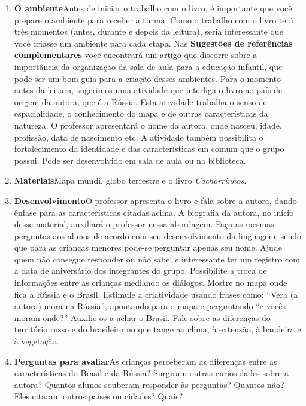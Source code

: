 \documentclass[11pt]{extarticle}
\begin{document}
\begin{enumerate}
\item \textbf{O ambiente}\quad Antes de iniciar o trabalho com o livro, é importante que você 
prepare o ambiente para receber a turma. Como o trabalho com o livro terá 
três momentos (antes, durante e depois da leitura), seria interessante que você 
criasse um ambiente para cada etapa. Nas \textbf{Sugestões de referências complementares} 
você encontrará um artigo que discorre sobre a importância da organização da sala 
de aula para a educação infantil, que pode ser um bom guia para a criação desses 
ambientes.
Para o momento antes da leitura, sugerimos uma atividade que interliga o livro ao país de origem da  autora, que é a Rússia. Esta atividade trabalha o senso de espacialidade, o conhecimento do mapa e de outras características da natureza. O professor apresentará o nome da autora, onde nasceu, idade, profissão, data de nascimento etc. A atividade também possibilita o fortalecimento da identidade e das características em comum que o grupo possui. Pode ser desenvolvido em sala de aula ou na biblioteca. 

\item \textbf{Materiais}\quad Mapa mundi, globo terrestre e o livro \textit{Cachorrinhos}. 

\item \textbf{Desenvolvimento}\quad O professor apresenta o livro e fala sobre a autora, dando ênfase para as características citadas acima. A biografia da autora, no início desse material, auxiliará o professor nessa abordagem. Faça as mesmas perguntas aos alunos de acordo com seu desenvolvimento da linguagem, sendo que para as crianças menores pode-se perguntar apenas seu nome. Ajude quem não consegue responder ou não sabe, é interessante ter um registro com a data de aniversário dos integrantes do grupo. Possibilite a troca de informações entre as crianças mediando os diálogos. Mostre no mapa onde fica a Rússia e o Brasil. Estimule a criatividade usando frases como: ``Vera (a autora) mora na Rússia'', apontando para o mapa e perguntando ``e vocês moram onde?'' Auxilie-os a achar o Brasil. Fale sobre as diferenças do território russo e do brasileiro no que tange ao clima, à  extensão, à bandeira e à vegetação.  

\item \textbf{Perguntas para avaliar}\quad As crianças perceberam as diferenças entre as características do Brasil e da Rússia? Surgiram outras curiosidades sobre a autora? Quantos alunos souberam responder às perguntas? Quantos não? Eles citaram outros países ou cidades? Quais? 

\end{enumerate}
\end{document}
